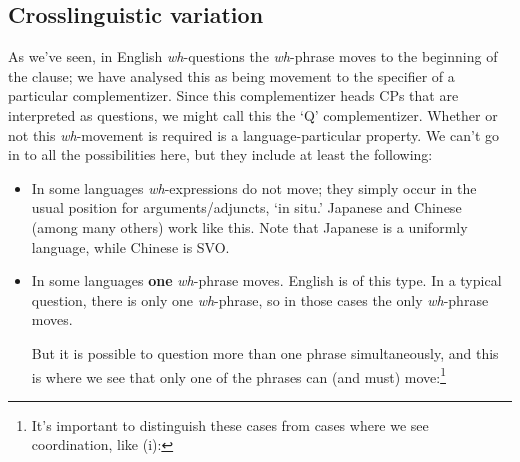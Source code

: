 \documentclass{article}
\begin{document}
\subsection{Crosslinguistic variation}
As we've seen, in English \emph{wh}-questions the \emph{wh}-phrase moves to the beginning of the clause; we have analysed this as being movement to the specifier of a particular complementizer.
Since this complementizer heads CPs that are interpreted as questions, we might call this the `Q' complementizer.
Whether or not this \emph{wh}-movement is required is a language-particular property. 
We can't go in to all the possibilities here, but they include at least the following:
\begin{itemize}
\item In some languages \emph{wh}-expressions do not move; they simply occur in the usual position for arguments/adjuncts, `in situ.'
Japanese and Chinese (among many others) work like this.
Note that Japanese is a uniformly  language, while Chinese is SVO.
\begin{exe}
    \ex[]{\gll Mary-wa [John-ga nani-o tabeta ka] siritagatteimasu.\\
    Mary-\Top{} [John-\Nom{} what-\Acc{} ate \Q{} wonders\\
    \trans `Mary wonders what John ate.'\hfill(Japanese)}
\end{exe}
\item In some languages \textbf{one} \emph{wh}-phrase moves.
English is of this type.
In a typical question, there is only one \emph{wh}-phrase, so in those cases the only \emph{wh}-phrase moves.
\begin{exe}
\end{exe}
But it is possible to question more than one phrase simultaneously, and this is where we see that only one of the phrases can (and must) move:\footnote{It's important to distinguish these cases from cases where we see coordination, like (i):
\vspace{-0.5em}
}
\end{itemize}
\end{document}
